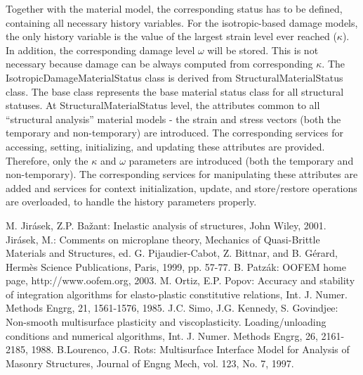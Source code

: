 \documentclass[epsf,a4paper]{article}
\begin{document}
 Together with the material model, the corresponding status has to be
 defined, containing all necessary history variables.
 For the isotropic-based damage models, the only history variable is 
 the value of the largest strain level ever reached ($\kappa$).
 In addition, the corresponding damage level $\omega$ will be stored.
 This is not necessary because damage can be always computed from
 corresponding $\kappa$.
 The IsotropicDamageMaterialStatus class is derived from 
 StructuralMaterialStatus class. The base class represents the
 base material status class for all structural statuses. At
 StructuralMaterialStatus level, the attributes common to all
 ``structural analysis'' material models - the strain and
 stress vectors (both the temporary and non-temporary) are introduced. The
 corresponding services for accessing, setting, initializing, and
 updating these attributes are provided.
 Therefore, only the $\kappa$ and $\omega$ parameters are introduced
 (both the temporary and non-temporary). The corresponding services for
 manipulating these attributes are added and services for context
 initialization, update, and store/restore operations are overloaded, to
 handle the history parameters properly.


\begin{thebibliography}{99}
 M. Jir\'asek, Z.P. Ba\v zant: Inelastic analysis of structures, John Wiley, 2001.
Jir\'{a}sek, M.: Comments on microplane theory, Mechanics of
Quasi-Brittle Materials and Structures, ed. G. Pijaudier-Cabot,
Z. Bittnar, and B. G\'{e}rard, Herm\`{e}s Science Publications, Paris, 1999,
pp. 57-77. 
 B. Patz\'ak: OOFEM home page, http://www.oofem.org, 2003.
 M. Ortiz, E.P. Popov: Accuracy and stability of integration algorithms for elasto-plastic constitutive relations, Int. J. Numer. Methods Engrg, 21, 1561-1576, 1985.
  J.C. Simo, J.G. Kennedy, S. Govindjee: Non-smooth multisurface plasticity and viscoplasticity. Loading/unloading conditions and numerical algorithms, Int. J. Numer. Methods Engrg, 26, 2161-2185, 1988.
 B.Lourenco, J.G. Rots: Multisurface Interface Model for Analysis of Masonry Structures, Journal of Engng Mech, vol. 123, No. 7, 1997. 
\end{thebibliography}
\end{document}
